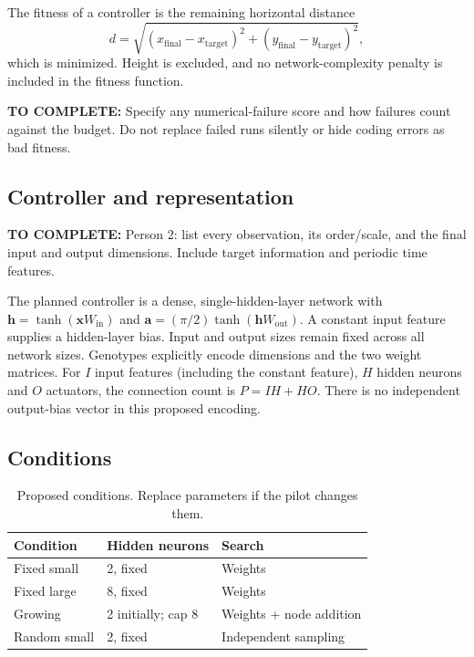 \documentclass[sigconf,nonacm]{acmart}
\newcommand{\todo}[1]{\par\smallskip\noindent\textcolor{blue!60!black}{\textbf{TO COMPLETE:} #1}\par\smallskip}
\begin{document}
The fitness of a controller is the remaining horizontal distance
\begin{equation}
 d = \sqrt{(x_{\mathrm{final}}-x_{\mathrm{target}})^2
           +(y_{\mathrm{final}}-y_{\mathrm{target}})^2},
\end{equation}
which is minimized. Height is excluded, and no network-complexity penalty is
included in the fitness function.
\todo{Specify any numerical-failure score and how failures count against the
budget. Do not replace failed runs silently or hide coding errors as bad fitness.}

\subsection{Controller and representation}
\todo{Person 2: list every observation, its order/scale, and the final input and
output dimensions. Include target information and periodic time features.}

The planned controller is a dense, single-hidden-layer network with
\(\mathbf{h}=\tanh(\mathbf{x}W_{\mathrm{in}})\) and
\(\mathbf{a}=(\pi/2)\tanh(\mathbf{h}W_{\mathrm{out}})\).
A constant input feature supplies a hidden-layer bias. Input and output sizes
remain fixed across all network sizes. Genotypes explicitly encode dimensions
and the two weight matrices. For $I$ input features (including the constant
feature), $H$ hidden neurons and $O$ actuators, the connection count is
$P=IH+HO$. There is no independent output-bias vector in this proposed encoding.

\subsection{Conditions}
\begin{table}[t]
\caption{Proposed conditions. Replace parameters if the pilot changes them.}
\label{tab:conditions}
\centering
\begin{tabular}{lll}
\toprule
Condition & Hidden neurons & Search\\
\midrule
Fixed small & 2, fixed & Weights\\
Fixed large & 8, fixed & Weights\\
Growing & 2 initially; cap 8 & Weights + node addition\\
Random small & 2, fixed & Independent sampling\\
\bottomrule
\end{tabular}
\end{table}
\end{document}
